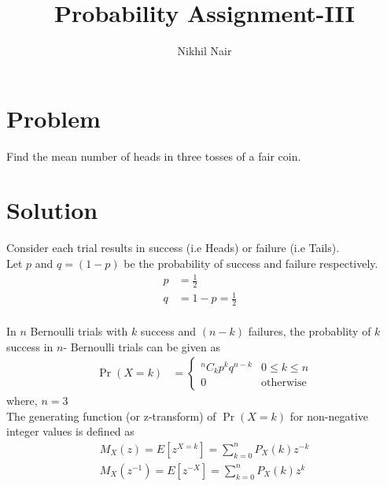 \documentclass[journal,12pt,twocolumn]{IEEEtran}
\title{\mytitle}
\title{
Probability Assignment-III
}
\author{Nikhil Nair}
\providecommand{\pr}[1]{\ensuremath{\Pr\left(#1\right)}}
\begin{document}
\maketitle
\bigskip


\section{\textbf{Problem }}
Find the mean number of heads in three tosses of a fair coin.


\section{\textbf{Solution }}
Consider each trial results in success (i.e Heads) or failure (i.e Tails).
\\
 
Let $p$ and $q = (1 - p)$ be the probability of success and failure respectively.
\begin{align}
p &= \frac{1}{2}&               \label{1}
\\            
q &= 1 - p = \frac{1}{2}&       \label{2}
\end{align}
\\
In $n$ Bernoulli trials with $k$ success and $(n - k)$ failures, the probablity of $k$ success in $n$- Bernoulli trials can be given as\\
\begin{align}
\pr{X =k}  &= 
\begin{cases}
{}^nC_kp^{k}q^{n-k} & 0 \le k \le n
\\
0 & \text{otherwise}                 \label{3}
\end{cases}
\end{align}
where, $n = 3$\\

The generating function (or z-transform) of $\pr{X =k}$ for non-negative integer values is defined as 
\\
\begin{align}
&M_X(z) = E[z^{X=k}] = \sum_{k=0}^{n} P_X(k)z^{-k}&
\\
&M_X(z^{-1}) = E[z^{-X}] = \sum_{k=0}^{n} P_X(k) z^{k}&
\end{align}
\\
\end{document}
